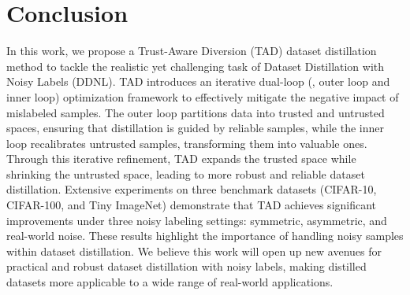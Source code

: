 \section{Conclusion}

In this work, we propose a Trust-Aware Diversion (TAD) dataset distillation method to tackle the realistic yet challenging task of Dataset Distillation with Noisy Labels (DDNL). 
TAD introduces an iterative dual-loop (\ie, outer loop and inner loop) optimization framework to effectively mitigate the negative impact of mislabeled samples.
The outer loop partitions data into trusted and untrusted spaces, ensuring that distillation is guided by reliable samples, while the inner loop recalibrates untrusted samples, transforming them into valuable ones.
Through this iterative refinement, TAD expands the trusted space while shrinking the untrusted space, leading to more robust and reliable dataset distillation.
Extensive experiments on three benchmark datasets (CIFAR-10, CIFAR-100, and Tiny ImageNet) demonstrate that TAD achieves significant improvements under three noisy labeling settings: symmetric, asymmetric, and real-world noise. 
These results highlight the importance of handling noisy samples within dataset distillation. 
We believe this work will open up new avenues for practical and robust dataset distillation with noisy labels, making distilled datasets more applicable to a wide range of real-world applications.





